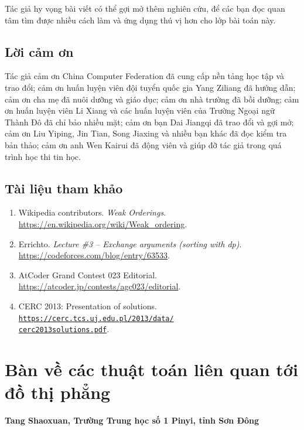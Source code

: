 \documentclass[11pt]{article}
\begin{document}
Tác giả hy vọng bài viết có thể gợi mở thêm nghiên cứu, để các bạn đọc quan tâm
tìm được nhiều cách làm và ứng dụng thú vị hơn cho lớp bài toán này.

\subsection*{Lời cảm ơn}

Tác giả cảm ơn China Computer Federation đã cung cấp nền tảng học tập và trao
đổi; cảm ơn huấn luyện viên đội tuyển quốc gia Yang Ziliang đã hướng dẫn; cảm
ơn cha mẹ đã nuôi dưỡng và giáo dục; cảm ơn nhà trường đã bồi dưỡng; cảm ơn
huấn luyện viên Li Xiang và các huấn luyện viên của Trường Ngoại ngữ Thành Đô
đã chỉ bảo nhiều mặt; cảm ơn bạn Dai Jiangqi đã trao đổi và gợi mở; cảm ơn Liu
Yiping, Jin Tian, Song Jiaxing và nhiều bạn khác đã đọc kiểm tra bản thảo; cảm
ơn anh Wen Kairui đã động viên và giúp đỡ tác giả trong quá trình học thi tin
học.

\subsection*{Tài liệu tham khảo}

\begin{enumerate}
  \item Wikipedia contributors. \emph{Weak Orderings}.
  \url{https://en.wikipedia.org/wiki/Weak_ordering}.
  \item Errichto. \emph{Lecture \#3 -- Exchange arguments (sorting with dp)}.
  \url{https://codeforces.com/blog/entry/63533}.
  \item AtCoder Grand Contest 023 Editorial.
  \url{https://atcoder.jp/contests/agc023/editorial}.
  \item CERC 2013: Presentation of solutions.
  \href{https://cerc.tcs.uj.edu.pl/2013/data/cerc2013solutions.pdf}
  {\texttt{https://cerc.tcs.uj.edu.pl/2013/data/}\\
  \texttt{cerc2013solutions.pdf}}.
\end{enumerate}

\section{Bàn về các thuật toán liên quan tới đồ thị phẳng}

\begin{center}
\textbf{Tang Shaoxuan, Trường Trung học số 1 Pinyi, tỉnh Sơn Đông}
\end{center}
\end{document}
